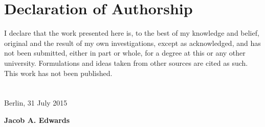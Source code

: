 \documentclass[%
   a4paper,%
  11pt,                    %
  openright,              %
  headsepline,          %
  cleardoubleempty,
  chapterprefix,
  titlepage,%
  liststotoc,%
  bibtotoc,%
  idxtotoc,%
  headinclude,           %
  pointlessnumbers,%
  USenglish
  ]{scrbook}
\theoremstyle{break}
\begin{document}


\cleardoublepage


\setcounter{page}{1}



\cleardoublepage


\cleardoublepage


\appendix 



%
\cleardoublepage





\cleardoublepage


\chapter*{Declaration of Authorship}

I declare that the work presented here is, to the best of my knowledge and belief, original and the result of my own investigations, except as acknowledged, and has not been submitted, either in part or whole, for a degree at this or any other university.
\linebreak
\linebreak
Formulations and ideas taken from other sources are cited as such. This work has not been published.\\
\\
\\


Berlin, 31 July 2015

\hspace*{\fill}\textbf{Jacob A. Edwards}


\end{document}
